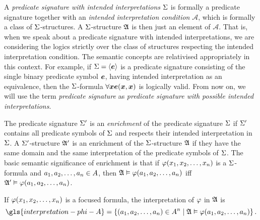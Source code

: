 
A \emph{predicate signature with intended interpretations} $\mathrm{\Sigma}$ is formally a
predicate signature together with an \emph{intended interpretation condition}
$\mathcal{A}$, which is formally a class of $\mathrm{\Sigma}$-structures.
A $\mathrm{\Sigma}$-structure $\mathfrak{A}$ is then just an element of $\mathcal{A}$. That is,
when we speak about a predicate signature with intended interpretations,
we are considering the logics strictly over the class of structures respecting
the intended interpretation condition. The semantic concepts are relativised
appropriately in this context. For example, if $\mathrm{\Sigma} = \left\langle \bm{e} \right\rangle$ is a
predicate signature consisting of the single binary predicate symbol $\bm{e}$,
having intended interpretation as an equivalence, then the $\mathrm{\Sigma}$-formula
$\forall\bm{x} \bm{e}(\bm{x},\bm{x})$ is logically valid.
From now on, we will use the term \emph{predicate signature} as \emph{predicate
signature with possible intended interpretations}.

The predicate signature $\mathrm{\Sigma'}$ is an \emph{enrichment} of the predicate
signature $\mathrm{\Sigma}$ if $\mathrm{\Sigma'}$ contains all predicate symbols of $\mathrm{\Sigma}$ and
respects their intended interpretation in $\mathrm{\Sigma}$. A $\mathrm{\Sigma'}$-structure $\mathfrak{A'}$
is an enrichment of the $\mathrm{\Sigma}$-structure $\mathfrak{A}$ if they have the same domain
and the same interpretation of the predicate symbols of $\mathrm{\Sigma}$.
The basic semantic significance of enrichment is that if
$\varphi(x_{1}, x_{2}, \dots, x_{n})$ is a $\mathrm{\Sigma}$-formula and $a_{1}, a_{2},
\dots, a_{n} \in A$, then $\mathfrak{A} \vDash \varphi(a_{1}, a_{2}, \dots, a_{n})$
iff $\mathfrak{A'} \vDash \varphi(a_{1}, a_{2}, \dots, a_{n})$.

If $\varphi(x_{1}, x_{2}, \dots, x_{n})$ is a focused formula, the
interpretation of $\varphi$ in $\mathfrak{A}$ is
\[
  \gls{interpretation-phi-A} = \setbd{(\eaa1, \eaa2, \dots, \eaa\nn) \in
  \domA^\nn}{\StrA \vDash \fphi(\eaa1, \eaa2, \dots, \eaa\nn)}.
\]
